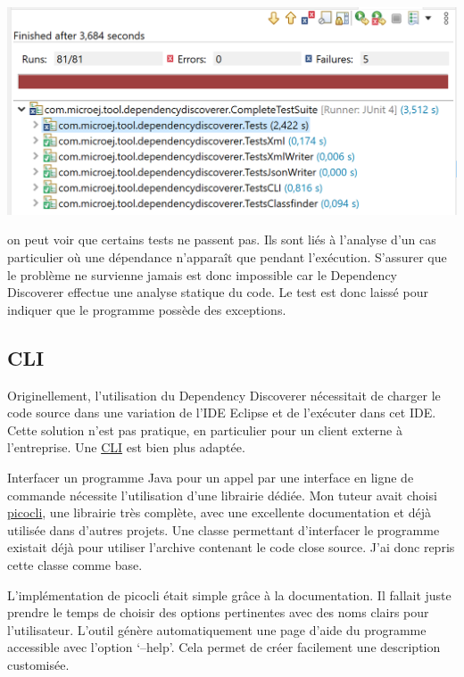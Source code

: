 \documentclass[french,a4paper,12pt]{report}
\begin{document}
\begin{center}
 	\includegraphics[width=\textwidth]{ressources/images/junit.png}
\end{center}

on peut voir que certains tests ne passent pas. Ils sont liés à l'analyse d'un cas particulier où une dépendance n’apparaît que pendant l’exécution. S'assurer que le problème ne survienne jamais est donc impossible car le Dependency Discoverer effectue une analyse statique du code. Le test est donc laissé pour indiquer que le programme possède des exceptions.

\subsection{CLI}

Originellement, l'utilisation du Dependency Discoverer nécessitait de charger le code source dans une variation de l'IDE Eclipse et de l’exécuter dans cet IDE. Cette solution n'est pas pratique, en particulier pour un client externe à l'entreprise. Une \hyperlink{CLI}{CLI} est bien plus adaptée.

Interfacer un programme Java pour un appel par une interface en ligne de commande nécessite l’utilisation d’une librairie dédiée. Mon tuteur avait choisi \href{https://picocli.info/}{picocli}, une librairie très complète, avec une excellente documentation et déjà utilisée dans d'autres projets. Une classe permettant d’interfacer le programme existait déjà pour utiliser l’archive contenant le code close source. J’ai donc repris cette classe comme base. 

L’implémentation de picocli était simple grâce à la documentation. Il fallait juste prendre le temps de choisir des options pertinentes avec des noms clairs pour l’utilisateur. L’outil génère automatiquement une page d’aide du programme accessible avec l’option ‘--help’. Cela permet de créer facilement une description customisée.
\end{document}
